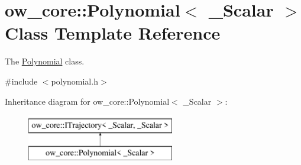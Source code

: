\hypertarget{classow__core_1_1Polynomial}{}\section{ow\+\_\+core\+:\+:Polynomial$<$ \+\_\+\+Scalar $>$ Class Template Reference}
\label{classow__core_1_1Polynomial}


The \hyperlink{classow__core_1_1Polynomial}{Polynomial} class.  




{\ttfamily \#include $<$polynomial.\+h$>$}

Inheritance diagram for ow\+\_\+core\+:\+:Polynomial$<$ \+\_\+\+Scalar $>$\+:\begin{figure}[H]
\begin{center}
\leavevmode
\includegraphics[height=2.000000cm]{df/dd0/classow__core_1_1Polynomial}
\end{center}
\end{figure}

